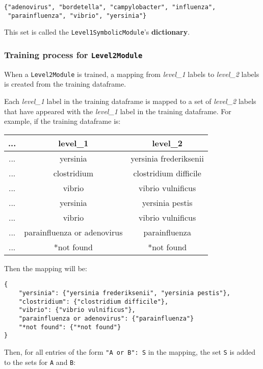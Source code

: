 \documentclass[a4paper]{article}
\begin{document}
\lstset{language=}
\begin{lstlisting}
{"adenovirus", "bordetella", "campylobacter", "influenza",
 "parainfluenza", "vibrio", "yersinia"}
\end{lstlisting}
\lstset{language=}

This set is called the \lstinline{Level1SymbolicModule}'s \textbf{dictionary}.

\subsubsection{Training process for \lstinline{Level2Module}}

When a \lstinline{Level2Module} is trained, a mapping from \textit{level\_1} labels to \textit{level\_2} labels is created from the training dataframe.

Each \textit{level\_1} label in the training dataframe is mapped to a set of \textit{level\_2} labels that have appeared with the \textit{level\_1} label in the training dataframe. For example, if the training dataframe is:

\begin{table}[H]
\begin{tabular}{|c|c|c|}
\hline
... & level\_1 & level\_2 \\\hline
... & yersinia & yersinia frederiksenii \\
... & clostridium & clostridium difficile \\
... & vibrio & vibrio vulnificus \\
... & yersinia & yersinia pestis \\
... & vibrio & vibrio vulnificus \\
... & parainfluenza or adenovirus & parainfluenza \\
... & *not found & *not found \\\hline
\end{tabular}
\end{table}

Then the mapping will be:

\lstset{language=}
\begin{lstlisting}
{
    "yersinia": {"yersinia frederiksenii", "yersinia pestis"},
    "clostridium": {"clostridium difficile"},
    "vibrio": {"vibrio vulnificus"},
    "parainfluenza or adenovirus": {"parainfluenza"}
    "*not found": {"*not found"}
}
\end{lstlisting}
\lstset{language=}

Then, for all entries of the form \lstinline{"A or B": S} in the mapping, the set \lstinline{S} is added to the sets for \lstinline{A} and \lstinline{B}:
\end{document}

